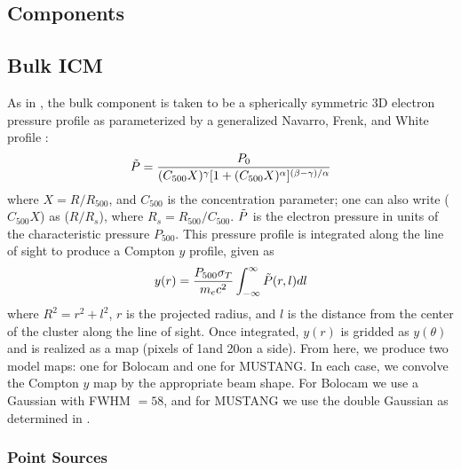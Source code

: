 \documentclass[iop,numberedappendix,apj]{emulateapj}
\begin{document}
\subsection{Components}
\label{sec:components}

\subsection{Bulk ICM}
\label{sec:bulk_ICM}

 As in \citet{romero2015a}, the bulk component is taken to be a 
spherically symmetric 3D electron pressure profile as parameterized by a generalized Navarro, Frenk,
and White profile \citep[hereafter, gNFW][]{navarro1997,nagai2007}:
\begin{equation}
  \Tilde{P} = \frac{P_0}{(C_{500} X)^{\gamma} [1 + (C_{500} X)^{\alpha}]^{(\beta - \gamma)/\alpha}}
\end{equation}
where $X = R / R_{500}$, and $C_{500}$ is the concentration parameter; one can also write ($C_{500} X$) as
($R / R_s$), where $R_s = R_{500}/C_{500}$. $\Tilde{P}$ is the electron pressure in units of the characteristic
pressure $P_{500}$. This pressure profile is integrated along the line of sight to produce 
a Compton $y$ profile, given as 
\begin{equation}
  y(r) = \frac{P_{500} \sigma_{T}}{m_e c^2} \int_{-\infty}^{\infty} \Tilde{P}(r,l) dl
\end{equation}
where $R^2 = r^2 + l^2$, $r$ is the projected radius, and $l$ is the distance from the center of the cluster
along the line of sight. Once integrated, $y(r)$ is gridded as $y(\theta)$ and  is realized as a map 
(pixels of 1\asecs and 20\asecs on a side). From here, we produce two model maps: one for Bolocam and one for MUSTANG. 
In each case, we convolve the Compton $y$ map by the appropriate beam shape. For Bolocam we use a Gaussian with FWHM
$= 58$\asec, and for MUSTANG we use the double Gaussian as determined in \citet{romero2015a}.

\subsubsection{Point Sources}
\label{sec:ptsrcs}
\end{document}
